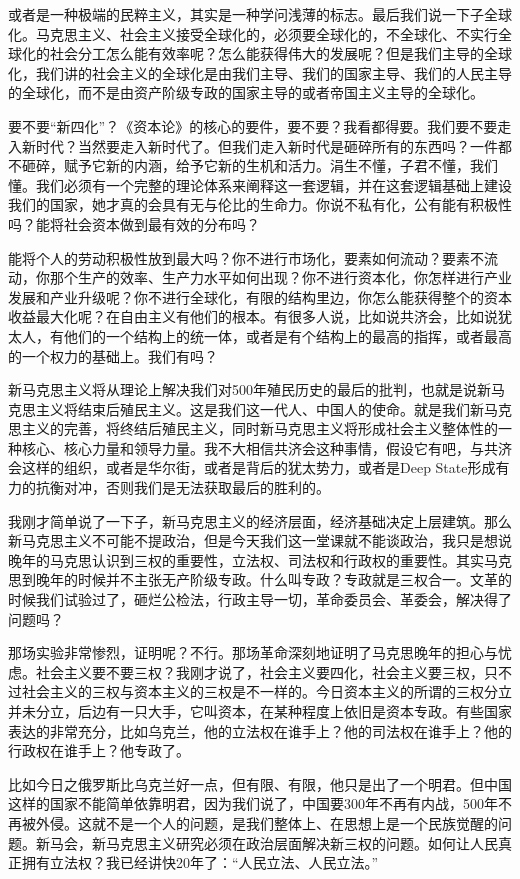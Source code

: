 \documentclass[UTF8, 12pt, a4paper]{ctexrep}
\begin{document}
或者是一种极端的民粹主义，其实是一种学问浅薄的标志。最后我们说一下子全球化。马克思主义、社会主义接受全球化的，必须要全球化的，不全球化、不实行全球化的社会分工怎么能有效率呢？怎么能获得伟大的发展呢？但是我们主导的全球化，我们讲的社会主义的全球化是由我们主导、我们的国家主导、我们的人民主导的全球化，而不是由资产阶级专政的国家主导的或者帝国主义主导的全球化。

要不要“新四化”？《资本论》的核心的要件，要不要？我看都得要。我们要不要走入新时代？当然要走入新时代了。但我们走入新时代是砸碎所有的东西吗？一件都不砸碎，赋予它新的内涵，给予它新的生机和活力。涓生不懂，子君不懂，我们懂。我们必须有一个完整的理论体系来阐释这一套逻辑，并在这套逻辑基础上建设我们的国家，她才真的会具有无与伦比的生命力。你说不私有化，公有能有积极性吗？能将社会资本做到最有效的分布吗？

能将个人的劳动积极性放到最大吗？你不进行市场化，要素如何流动？要素不流动，你那个生产的效率、生产力水平如何出现？你不进行资本化，你怎样进行产业发展和产业升级呢？你不进行全球化，有限的结构里边，你怎么能获得整个的资本收益最大化呢？在自由主义有他们的根本。有很多人说，比如说共济会，比如说犹太人，有他们的一个结构上的统一体，或者是有个结构上的最高的指挥，或者最高的一个权力的基础上。我们有吗？

新马克思主义将从理论上解决我们对500年殖民历史的最后的批判，也就是说新马克思主义将结束后殖民主义。这是我们这一代人、中国人的使命。就是我们新马克思主义的完善，将终结后殖民主义，同时新马克思主义将形成社会主义整体性的一种核心、核心力量和领导力量。我不大相信共济会这种事情，假设它有吧，与共济会这样的组织，或者是华尔街，或者是背后的犹太势力，或者是Deep State形成有力的抗衡对冲，否则我们是无法获取最后的胜利的。

我刚才简单说了一下子，新马克思主义的经济层面，经济基础决定上层建筑。那么新马克思主义不可能不提政治，但是今天我们这一堂课就不能谈政治，我只是想说晚年的马克思认识到三权的重要性，立法权、司法权和行政权的重要性。其实马克思到晚年的时候并不主张无产阶级专政。什么叫专政？专政就是三权合一。文革的时候我们试验过了，砸烂公检法，行政主导一切，革命委员会、革委会，解决得了问题吗？

那场实验非常惨烈，证明呢？不行。那场革命深刻地证明了马克思晚年的担心与忧虑。社会主义要不要三权？我刚才说了，社会主义要四化，社会主义要三权，只不过社会主义的三权与资本主义的三权是不一样的。今日资本主义的所谓的三权分立并未分立，后边有一只大手，它叫资本，在某种程度上依旧是资本专政。有些国家表达的非常充分，比如乌克兰，他的立法权在谁手上？他的司法权在谁手上？他的行政权在谁手上？他专政了。

比如今日之俄罗斯比乌克兰好一点，但有限、有限，他只是出了一个明君。但中国这样的国家不能简单依靠明君，因为我们说了，中国要300年不再有内战，500年不再被外侵。这就不是一个人的问题，是我们整体上、在思想上是一个民族觉醒的问题。新马会，新马克思主义研究必须在政治层面解决新三权的问题。如何让人民真正拥有立法权？我已经讲快20年了：“人民立法、人民立法。”
\end{document}
